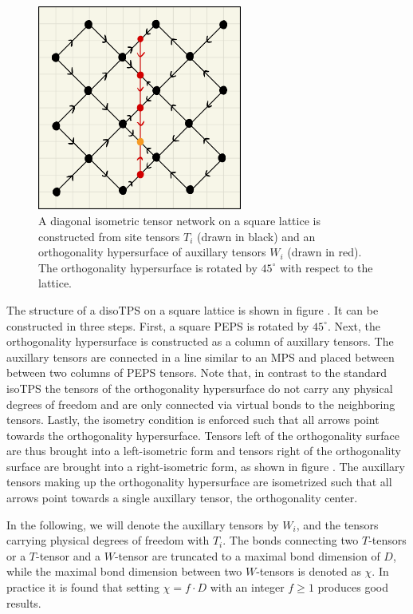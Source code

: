 \begin{figure}
	\centering
	\includegraphics[width=0.6\textwidth]{figures/Tensor_Networks/disoTPS.jpeg}
	\caption{A diagonal isometric tensor network on a square lattice is constructed from site tensors $T_i$ (drawn in black) and an orthogonality hypersurface of auxillary tensors $W_i$ (drawn in red). The orthogonality hypersurface is rotated by $45^\circ$ with respect to the lattice.}
	\label{fig:disoTPS_structure}
\end{figure}
The structure of a disoTPS on a square lattice is shown in figure . It can be constructed in three steps. First, a square PEPS is rotated by $45^\circ$. Next, the orthogonality hypersurface is constructed as a column of auxillary tensors. The auxillary tensors are connected in a line similar to an MPS and placed between between two columns of PEPS tensors. Note that, in contrast to the standard isoTPS the tensors of the orthogonality hypersurface do not carry any physical degrees of freedom and are only connected via virtual bonds to the neighboring tensors. Lastly, the isometry condition is enforced such that all arrows point towards the orthogonality hypersurface. Tensors left of the orthogonality surface are thus brought into a left-isometric form and tensors right of the orthogonality surface are brought into a right-isometric form, as shown in figure . The auxillary tensors making up the orthogonality hypersurface are isometrized such that all arrows point towards a single auxillary tensor, the orthogonality center. \par
In the following, we will denote the auxillary tensors by $W_i$, and the tensors carrying physical degrees of freedom with $T_i$. The bonds connecting two $T$-tensors or a $T$-tensor and a $W$-tensor are truncated to a maximal bond dimension of $D$, while the maximal bond dimension between two $W$-tensors is denoted as $\chi$. In practice it is found that setting $\chi=f\cdot D$ with an integer $f\ge1$ produces good results. \par
